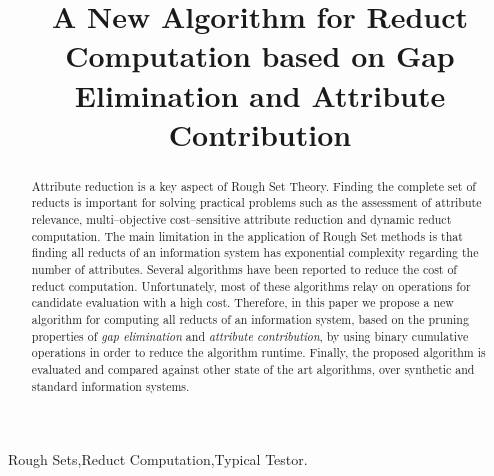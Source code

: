 \documentclass[authoryear,preprint,review,12pt]{elsarticle}
\begin{document}
	
	\title{A New Algorithm for Reduct Computation based on Gap Elimination 
		   and Attribute Contribution}
		
	
	\address{Computer Science Department\\
	Instituto Nacional de Astrof\'{\i}sica, \'{O}ptica y Electr\'{o}nica\\
	Luis Enrique Erro \# 1, Santa Mar\'{\i}a Tonantzintla, Puebla,
	72840, M\'{e}xico} 
	
	\begin{abstract}
		Attribute reduction is a key aspect of Rough Set Theory.  Finding the complete set of reducts is important for solving practical problems such as the assessment of attribute relevance, multi--objective 		cost--sensitive attribute reduction and dynamic reduct computation. The main limitation in the application of Rough Set methods is that finding all reducts of an information system has exponential complexity regarding the number of attributes. Several algorithms have been reported to reduce the cost of reduct computation. Unfortunately, most of these algorithms relay on operations for candidate evaluation with a high cost. Therefore, in this paper we propose a new algorithm for computing all reducts of an information system, based on the pruning properties of \textit{gap  elimination} and \textit{attribute contribution}, by using binary cumulative operations in order to reduce the algorithm runtime. Finally, the proposed algorithm is evaluated and compared against other state of the art algorithms, over synthetic and standard information systems.
	\end{abstract}
	
	\begin{keyword}
		Rough Sets\sep Reduct Computation\sep Typical Testor.
	\end{keyword}

	\maketitle

\end{document}
